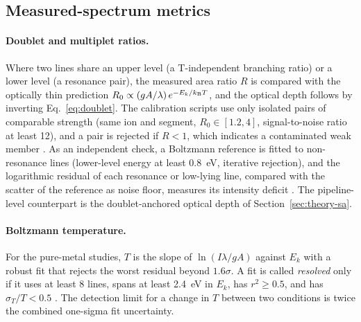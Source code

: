 \subsection{Measured-spectrum metrics}

\paragraph{Doublet and multiplet ratios.}
Where two lines share an upper level (a T-independent branching ratio) or a lower level (a resonance pair), the measured area ratio $R$ is compared with the optically thin prediction $R_0\propto(gA/\lambda)\,e^{-E_k/k_{\mathrm{B}} T}$, and the optical depth follows by inverting Eq.~\eqref{eq:doublet}. The calibration scripts use only isolated pairs of comparable strength (same ion and segment, $R_0\in[1.2,4]$, signal-to-noise ratio at least 12), and a pair is rejected if $R<1$, which indicates a contaminated weak member %
. As an independent check, a Boltzmann reference is fitted to non-resonance lines (lower-level energy at least \SI{0.8}{\electronvolt}, iterative rejection), and the logarithmic residual of each resonance or low-lying line, compared with the scatter of the reference as noise floor, measures its intensity deficit %
. The pipeline-level counterpart is the doublet-anchored optical depth of Section~\ref{sec:theory-sa}.

\paragraph{Boltzmann temperature.}
For the pure-metal studies, $T$ is the slope of $\ln(I\lambda/gA)$ against $E_k$ with a robust fit that rejects the worst residual beyond $1.6\sigma$. A fit is called \emph{resolved} only if it uses at least 8 lines, spans at least \SI{2.4}{\electronvolt} in $E_k$, has $r^2\ge0.5$, and has $\sigma_T/T<0.5$ %
. The detection limit for a change in $T$ between two conditions is twice the combined one-sigma fit uncertainty.

